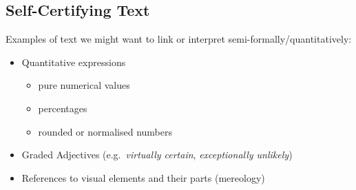 \subsection{Self-Certifying Text}
Examples of text we might want to link or interpret semi-formally/quantitatively:

\begin{itemize}
\item Quantitative expressions
\begin{itemize}
   \item pure numerical values
   \item percentages
   \item rounded or normalised numbers
\end{itemize}
\item Graded Adjectives (e.g.~\emph{virtually certain}, \emph{exceptionally unlikely})
\item References to visual elements and their parts (mereology)
\end{itemize}



